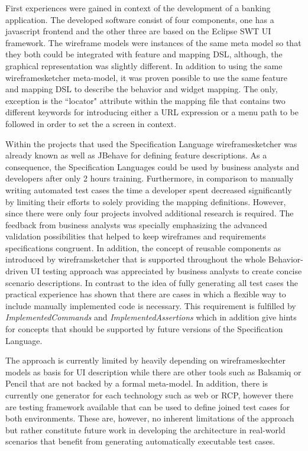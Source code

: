 \documentclass{sig-alternate-05-2015}
\begin{document}

First experiences were gained in context of the development of a banking application. 
The developed software consist of four components, one has a javascript frontend and the other three are based on the Eclipse SWT UI framework.
The wireframe models were instances of the same meta model so that they both could be integrated with feature and mapping DSL, although, the graphical representation was slightly different.
In addition to using the same wireframesketcher meta-model, it was proven possible to use the same feature and mapping DSL to describe the behavior and widget mapping.
The only, exception is the ``locator" attribute within the mapping file that contains two different keywords for introducing either a URL expression or a menu path to be followed in order to set the a screen in context.

Within the projects that used the Specification Language wireframesketcher was already known as well as JBehave for defining feature descriptions.
As a consequence, the Specification Languages could be used by business analysts and developers after only 2 hours training.
Furthermore, in comparison to manually writing automated test cases the time a developer spent decreased significantly by limiting their efforts to solely providing the mapping definitions.
However, since there were only four projects involved additional research is required.
The feedback from business analysts was specially emphasizing the advanced validation possibilities that helped to keep wireframes and requirements specifications congruent.
In addition, the concept of reusable components as introduced by wireframsketcher that is supported throughout the whole Behavior-driven UI testing approach was appreciated by business analysts to create concise scenario descriptions.
In contrast to the idea of fully generating all test cases the practical experience has shown that there are cases in which a flexible way to include manually implemented code is necessary. 
This requirement is fulfilled by \textit{ImplementedCommands} and \textit{ImplementedAssertions} which in addition give hints for concepts that should be supported by future versions of the Specification Language.

The approach is currently limited by heavily depending on wireframeskechter models as basis for UI description while there are other tools such as Balsamiq or Pencil that are not backed by a formal meta-model.
In addition, there is currently one generator for each technology such as web or RCP, however there are testing framework available that can be used to define joined test cases for both environments.
These are, however, no inherent limitations of the approach but rather constitute future work in developing the architecture in real-world scenarios that benefit from generating automatically executable test cases.
\end{document}
